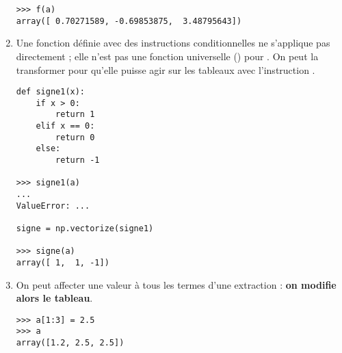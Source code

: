 \begin{enumerate}
\begin{lstlisting}
>>> f(a)
array([ 0.70271589, -0.69853875,  3.48795643])
\end{lstlisting}
\item Une fonction définie avec des instructions conditionnelles ne s'applique pas directement ; elle n'est pas une fonction universelle () pour . On peut la transformer pour qu'elle puisse agir sur les tableaux  avec l'instruction .
\begin{lstlisting}
def signe1(x):   
    if x > 0: 
        return 1    
    elif x == 0:
        return 0
    else:
        return -1

>>> signe1(a)
...
ValueError: ...

signe = np.vectorize(signe1)

>>> signe(a)
array([ 1,  1, -1])
\end{lstlisting} 
\item On peut affecter une valeur à tous les termes d'une extraction :
{\bf on modifie alors le tableau}.
\begin{lstlisting}
>>> a[1:3] = 2.5
>>> a
array([1.2, 2.5, 2.5])
\end{lstlisting} 
\end{enumerate}
